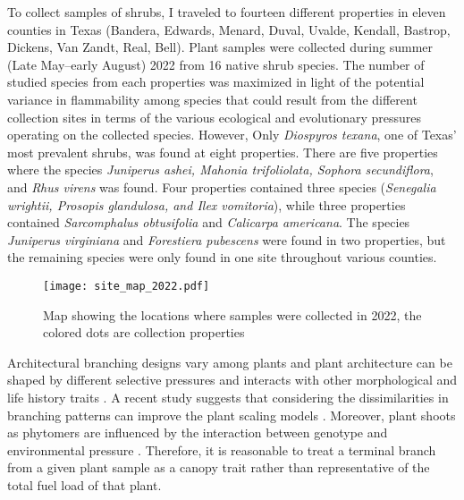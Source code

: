 \documentclass[12pt]{report}
\begin{document}
To collect samples of shrubs, I traveled to fourteen different properties in eleven counties in Texas (Bandera, Edwards, Menard, Duval, Uvalde, Kendall, Bastrop, Dickens, Van Zandt, Real, Bell). Plant samples were collected during summer (Late May–early August) 2022 from 16 native shrub species. The number of studied species from each properties was maximized in light of the potential variance in flammability among species that could result from the different collection sites in terms of the various ecological and evolutionary pressures operating on the collected species. However, Only \emph{Diospyros texana}, one of Texas' most prevalent shrubs, was found at eight properties. There are five properties where the species \emph{Juniperus ashei, Mahonia trifoliolata, Sophora secundiflora}, and \emph{Rhus virens} was found. Four properties contained three species (\emph{Senegalia wrightii, Prosopis glandulosa, and Ilex vomitoria}), while three properties contained \emph{Sarcomphalus obtusifolia} \citep{hauenschild2016phylogenetic} and \emph{Calicarpa americana}. The species \emph{Juniperus virginiana} and \emph{Forestiera pubescens} were found in two properties, but the remaining species were only found in one site throughout various counties.\\

\begin{figure}
    \centering
    \texttt{[image: site\_map\_2022.pdf]}
    \caption{Map showing the locations where samples were collected in 2022, the colored dots are collection properties}
\end{figure}

Architectural branching designs vary among plants \citep{halle2012tropical} and plant architecture can be shaped by different selective pressures \citep{danell1994browseeffects, schwilk2003flammability} and interacts with other morphological and life history traits \citep{ackerly1998leaf, schwilk2001flammability,archibald2003growing}. A recent study suggests that considering the dissimilarities in branching patterns can improve the plant scaling models \citep{bentley2013empirical}. Moreover, plant shoots as phytomers are influenced by the interaction between genotype and environmental pressure \citep{mcsteen2005shoot, wang2008molecular}. Therefore, it is reasonable to treat a terminal branch from a given plant sample as a canopy trait rather than representative of the total fuel load of that plant.\\
\end{document}
